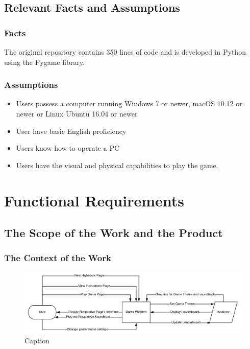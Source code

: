 \documentclass[12pt]{article}
\begin{document}
\subsection{Relevant Facts and Assumptions}
\subsubsection{Facts}
The original repository contains 350 lines of code and is developed in Python using the Pygame library. 
\subsubsection{Assumptions}
\begin{itemize}
    \item Users possess a computer running Windows 7 or newer, macOS 10.12 or newer or Linux Ubuntu 16.04 or newer
   \item User have basic English proficiency 
    \item Users know how to operate a PC
    \item Users have the visual and physical capabilities to play the game.
\end{itemize}

\section{Functional Requirements}

\subsection{The Scope of the Work and the Product}

\subsubsection{The Context of the Work}
\begin{figure}[!ht]
    \centering
    \includegraphics[width=1.02\textwidth]{context_diagram.png}
    \caption{Caption}
\end{figure}
\end{document}
